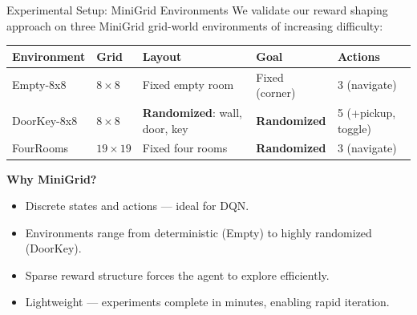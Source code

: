 \documentclass[11pt,aspectratio=169]{beamer}
\begin{document}
\begin{frame}{Experimental Setup: MiniGrid Environments}
    We validate our reward shaping approach on three MiniGrid grid-world environments of increasing difficulty:

    \vspace{0.2cm}
    \begin{table}[h]
    \centering
    \small
    \begin{tabular}{p{3cm}p{1.2cm}p{3cm}p{2.5cm}p{2.5cm}}
        \toprule
        \textbf{Environment} & \textbf{Grid} & \textbf{Layout} & \textbf{Goal} & \textbf{Actions} \\
        \midrule
        Empty-8x8 & $8 \times 8$ & Fixed empty room & Fixed (corner) & 3 (navigate) \\
        \addlinespace
        DoorKey-8x8 & $8 \times 8$ & \textbf{Randomized}: wall, door, key & \textbf{Randomized} & 5 (+pickup, toggle) \\
        \addlinespace
        FourRooms & $19 \times 19$ & Fixed four rooms & \textbf{Randomized} & 3 (navigate) \\
        \bottomrule
    \end{tabular}
    \end{table}

    \vspace{0.2cm}
    \textbf{Why MiniGrid?}
    \begin{itemize}
        \item Discrete states and actions — ideal for DQN.
        \item Environments range from deterministic (Empty) to highly randomized (DoorKey).
        \item Sparse reward structure forces the agent to explore efficiently.
        \item Lightweight — experiments complete in minutes, enabling rapid iteration.
    \end{itemize}
\end{frame}
\end{document}
